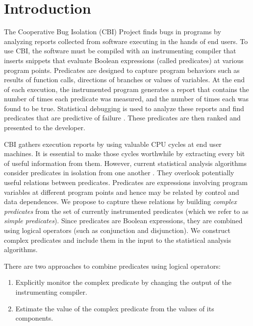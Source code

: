 
\section{Introduction}

The Cooperative Bug Isolation (CBI) Project \cite{Liblit:2004:CBI} finds bugs in programs by analyzing reports collected from software executing in the hands of end users.  To use CBI, the software must be compiled with an instrumenting compiler that inserts snippets that evaluate Boolean expressions (called predicates) at various program points.  Predicates are designed to capture program behaviors such as results of function calls, directions of branches or values of variables.  At the end of each execution, the instrumented program generates a report that contains the number of times each predicate was measured, and the number of times each was found to be true.  Statistical debugging is used to analyze these reports and find predicates that are predictive of failure \cite{Liblit:2005:SSBI,Zheng:2006:SDSIMB}.  These predicates are then ranked and presented to the developer.

CBI gathers execution reports by using valuable CPU cycles at end user machines.  It is essential to make those cycles worthwhile by extracting every bit of useful information from them.  However, current statistical analysis algorithms consider predicates in isolation from one another \cite{Liblit:2005:SSBI,Zheng:2006:SDSIMB}.  They overlook potentially useful relations between predicates.  Predicates are expressions involving program variables at different program points and hence may be related by control and data dependences.  We propose to capture these relations by building \emph{complex predicates} from the set of currently instrumented predicates (which we refer to as \emph{simple predicates}).  Since predicates are Boolean expressions, they are combined using logical operators (such as conjunction and disjunction).  We construct complex predicates and include them in the input to the statistical analysis algorithms.

There are two approaches to combine predicates using logical operators:
\begin{enumerate}
\item Explicitly monitor the complex predicate by changing the output of the instrumenting compiler.
\item Estimate the value of the complex predicate from the values of its components.
\end{enumerate}

